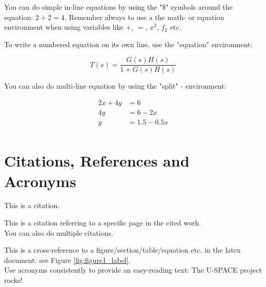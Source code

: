 You can do simple in-line equations by using the "\$" symbols around the equation: $2+2=4$. Remember always to use a the math- or equation environment when using variables like $+$, $=$, $x^{2}$, $f_{2}$ etc.

To write a numbered equation on its own line, use the "equation" environment: 

\begin{equation}
\label{eq:equation1_label}
T(s)=\frac{G(s)H(s)}{1+G(s)H(s)}
\end{equation}

You can also do multi-line equation by using the "split" - environment:

\begin{equation}
\begin{split}
\label{eq:equation2_label}
2x+4y&=6\\	%
4y&=6-2x\\
y&=1.5-0.5x\\
\end{split}
\end{equation}

\section{Citations, References and Acronyms}

This is a citation\cite{CitationReference1}.

This is a citation referring to a specific page in the cited work\cite[28]{CitationReference1}. 
\\
You can also do multiple citations\cite{CitationReference1,CitationReference2}.

This is a cross-reference to a figure/section/table/equation etc. in the latex document: see Figure \ref{fig:figure1_label}.
\\
Use acronyms consistently to provide an easy-reading text: The \ac{U-SPACE} project rocks!